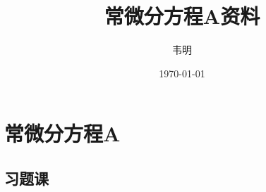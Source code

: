 \documentclass[12pt,lang=en,thmcnt=subsection,pad]{elegantbook}
\title{常微分方程A资料}
\author{韦明}
\date{\today}
\numberwithin{equation}{section}
\begin{document}
\maketitle
\frontmatter

\tableofcontents

\mainmatter
\chapter{常微分方程A}
\section{习题课}





\end{document}
